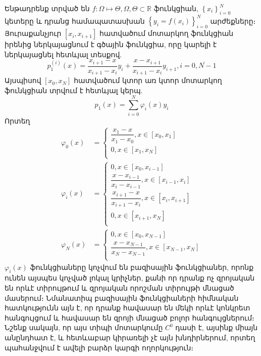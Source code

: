 \documentclass[fleqn, bachelor,subf,12pt,notitlepage]{article}
\begin{document}
Ենթադրենք տրված են $f:\Omega \mapsto \Theta, \Omega, \Theta \subset \mathbb{R}$ ֆունկցիան,  $\left\{x_{i}\right\}_{i=0}^{N}$ կետերը և դրանց համապատասխան $\left\{y_{i}=f\left(x_{i}\right)\right\}_{i=0}^{N}$ արժեքները։ Յուրաքանչյուր $\left[x_{i}, x_{i+1}\right]$ հատվածում  մոտարկող ֆունկցիան իրենից ներկայացնում է գծային ֆունկցիա, որը կարելի է ներկայացնել հետևյալ տեսքով.
\begin{equation}
p_{1}^{(i)}\left(x\right)=\dfrac{x_{i+1}-x}{x_{i+1}-x_{i}}y_{i}+\dfrac{x-x_{i+1}}{x_{i+1}-x_{i}}y_{i+1}, i=\overline{0, N-1}
\end{equation}
Այսպիսով $\left[x_{0}, x_{N}\right]$ հատվածում կտոր առ կտոր մոտարկող ֆունկցիան տրվում է հետևյալ կերպ.
\begin{equation}
p_{1}\left(x\right)=\sum_{i=0}^{N}\varphi_{i} \left(x\right)y_{i}
\end{equation}
Որտեղ 
\begin{equation}
\begin{aligned}
\varphi_{0}\left(x\right)&=\begin{cases}
\dfrac{x_{1}-x}{x_{1}-x_{0}}, x\in \left[x_{0}, x_{1}\right]\\
0, x\in \left[x_{1}, x_{N}\right]\\
\end{cases}\\
\varphi_{i}\left(x\right)&=\begin{cases}
0, x\in \left[x_{0}, x_{i-1}\right]\\
\dfrac{x-x_{i-1}}{x_{i}-x_{i-1}}, x\in \left[x_{i-1}, x_{i}\right]\\
\dfrac{x_{i+1}-x}{x_{i+1}-x_{i}}, x\in \left[x_{i}, x_{i+1}\right]\\
0, x\in \left[x_{i+1}, x_{N}\right]\\
\end{cases}\\
\varphi_{N}\left(x\right)&=\begin{cases}
0, x\in \left[x_{0}, x_{N-1}\right]\\
\dfrac{x-x_{N-1}}{x_{N}-x_{N-1}}, x\in \left[x_{N-1}, x_{N}\right]\\
\end{cases}
\end{aligned}
\end{equation}
$\varphi_{i}\left(x\right)$ ֆունկցիաները կոչվում են բազիսային ֆունկցիաներ, որոնք ունեն այսպես կոչված լոկալ կրիչներ, քանի որ դրանք ոչ զրոյական են որևէ տիրույթում և զրոյական որոշման տիրույթի մնացած մասերում։
Նմանատիպ բազիսային ֆունկցիաների հիմնական հատկությունն այն է, որ դրանք հավասար են մեկի որևէ կոնկրետ հանգույցում և հավասար են զրոյի մնացած բոլոր հանգույցներում։ Նշենք սակայն, որ այս տիպի մոտարկումը $C^{0}$ դասի է, այսինք միայն անընդհատ է, և հետևաբար կիրառելի չէ այն խնդիրներում, որտեղ պահանջվում է ավելի բարձր կարգի ողորկություն։
\end{document}
